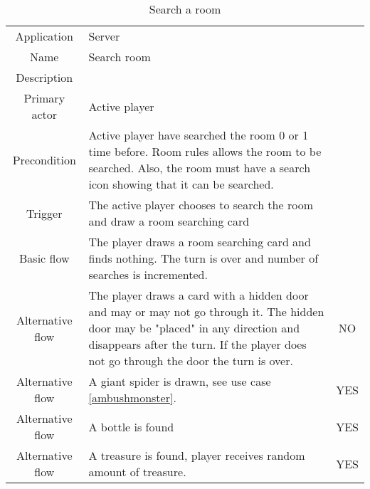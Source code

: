 \documentclass[a4paper,10pt]{report}
\begin{document}
\begin{table}
\caption{Search a room}
\label{searchroom}
\begin{tabular}{|c| p{9cm}|c}
\hline
Application & Server & \\
Name & Search room & \\
Description &  & \\
Primary actor & Active player & \\
Precondition & Active player have searched the room 0 or 1 time before. Room rules allows the room to be searched. Also, the room must have a search icon showing that it can be searched.  & \\
Trigger & The active player chooses to search the room and draw a room searching card  & \\ \hline
Basic flow & The player draws a room searching card and finds nothing. The turn is over and number of searches is incremented. & \\ \hline
Alternative flow & The player draws a card with a hidden door and may or may not go through it. The hidden door may be "placed" in any direction and disappears after the turn. If the player does not go through the door the turn is over. & NO \\\hline
Alternative flow & A giant spider is drawn, see use case \ref{ambushmonster}. & YES \\ \hline
Alternative flow & A bottle is found & YES \\ \hline
Alternative flow & A treasure is found, player receives random amount of treasure. & YES \\
\hline
\end{tabular}
\end{table}
\end{document}
